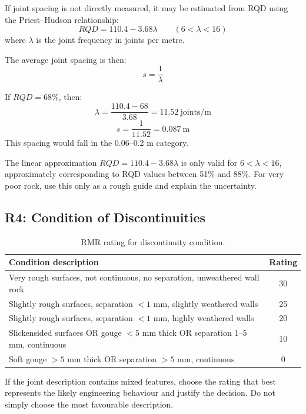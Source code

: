 \documentclass[a4paper,12pt]{article}
\begin{document}
If joint spacing is not directly measured, it may be estimated from RQD using the
Priest--Hudson relationship:
\[
RQD = 110.4 - 3.68\lambda
\qquad
(6 < \lambda < 16)
\]
where \(\lambda\) is the joint frequency in joints per metre.

The average joint spacing is then:
\[
s = \frac{1}{\lambda}
\]

\begin{calcbox}
If \(RQD = 68\%\), then:
\[
\lambda = \frac{110.4 - 68}{3.68} = 11.52~\text{joints/m}
\]
\[
s = \frac{1}{11.52}=0.087~\text{m}
\]
This spacing would fall in the 0.06--0.2 m category.
\end{calcbox}

\begin{warnbox}
The linear approximation \(RQD = 110.4 - 3.68\lambda\) is only valid for
\(6 < \lambda < 16\), approximately corresponding to RQD values between 51\% and 88\%.
For very poor rock, use this only as a rough guide and explain the uncertainty.
\end{warnbox}

\subsection{R4: Condition of Discontinuities}

\begin{table}[H]
\centering
\small
\begin{tabularx}{\textwidth}{Y c}
\toprule
\textbf{Condition description} & \textbf{Rating} \\
\midrule
Very rough surfaces, not continuous, no separation, unweathered wall rock & 30 \\
Slightly rough surfaces, separation \(<1\) mm, slightly weathered walls & 25 \\
Slightly rough surfaces, separation \(<1\) mm, highly weathered walls & 20 \\
Slickensided surfaces OR gouge \(<5\) mm thick OR separation 1--5 mm, continuous & 10 \\
Soft gouge \(>5\) mm thick OR separation \(>5\) mm, continuous & 0 \\
\bottomrule
\end{tabularx}
\caption{RMR rating for discontinuity condition.}
\label{tab:rmr_condition}
\end{table}

\begin{notebox}
If the joint description contains mixed features, choose the rating that best represents
the likely engineering behaviour and justify the decision. Do not simply choose the most
favourable description.
\end{notebox}
\end{document}

